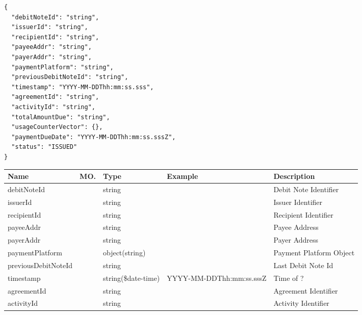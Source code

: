 \begin{enumerate}
\begin{tcolorbox}[boxrule=0pt, frame empty]
\begin{verbatim}
{
  "debitNoteId": "string",
  "issuerId": "string",
  "recipientId": "string",
  "payeeAddr": "string",
  "payerAddr": "string",
  "paymentPlatform": "string",
  "previousDebitNoteId": "string",
  "timestamp": "YYYY-MM-DDThh:mm:ss.sss",
  "agreementId": "string",
  "activityId": "string",
  "totalAmountDue": "string",
  "usageCounterVector": {},
  "paymentDueDate": "YYYY-MM-DDThh:mm:ss.sssZ",
  "status": "ISSUED"
}

\end{verbatim}
\end{tcolorbox}

\begin{table}[H]
\footnotesize

\begin{center}
\begin{tabular}{|p{3cm}|l|p{3cm}|p{3cm}|p{4cm}|} 
\hline
\rowcolor{lightgray}	Name	& MO.	& Type	& Example & 	Description \\
\hline

debitNoteId				&	&	string				&																		&	Debit Note Identifier \\
\hline   

issuerId				&	&	string				&																		&	Issuer Identifier \\
\hline   
  
recipientId				&	&	string				&																		&	Recipient Identifier \\
\hline   

payeeAddr				&	&	string				&																		&	Payee Address \\
\hline   
  
payerAddr				&	&	string				&																		&	Payer Address \\
\hline
   
paymentPlatform			&	&	object(string)		&																		&	Payment Platform Object \\
\hline

previousDebitNoteId		&	&	string				&																		& 	Last Debit Note Id \\
\hline

timestamp				&   &	string(\$date-time)	&	YYYY-MM-DDThh:mm:ss.sssZ											&	Time of ? \\
\hline

agreementId				& 	& 	string				&																		&	Agreement Identifier \\ 
\hline

activityId				& 	& 	string				&																		&	Activity Identifier \\ 
\hline


\end{tabular}
\end{center}
\end{table}
\end{enumerate}
